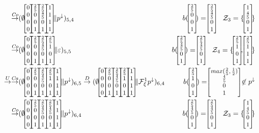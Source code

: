 \begin{example}
\begin{figure}[t]
{\begin{align*}
				\tr{\mathit{Co}}                                                                                                                                                                    & (\emptyset\cvec{0}{0}{0}{0}\cvec{\frac{2}{5}}{0}{0}{1} \cvec{\frac{2}{5}}{\frac{4}{5}}{0}{1} \cvec{1}{1}{1}{1} \| p^\downarrow)_{5,4}                                                                                                                                                                                                                        & b(\cvec{\frac{2}{5}}{0}{0}{1})= \cvec{\frac{2}{5}}{\frac{4}{5}}{0}{1} \quad \mathcal{Z}_3 = \{ \cvec{1}{\frac{4}{5}}{0}{1} \}                                       \\
				\tr{\mathit{Co}}                                                                                                                                                                    & (\emptyset\cvec{0}{0}{0}{0}\cvec{\frac{2}{5}}{0}{0}{1} \cvec{\frac{2}{5}}{\frac{4}{5}}{0}{1} \cvec{\frac{2}{5}}{1}{0}{1} \| \varepsilon)_{5,5}                                                                                                                                                                                                               & b(\cvec{\frac{2}{5}}{\frac{4}{5}}{0}{1})= \cvec{\frac{2}{5}}{\frac{4}{5}}{0}{1} \quad \mathcal{Z}_4 =\{ \cvec{\frac{2}{5}}{1}{0}{1}, \cvec{\frac{2}{5}}{1}{1}{1} \} \\
				\tr{U} \tr{\mathit{Ca}}                                                                                                                                                             & (\emptyset\cvec{0}{0}{0}{0}\cvec{\frac{2}{5}}{0}{0}{1} \cvec{\frac{2}{5}}{\frac{4}{5}}{0}{1} \cvec{\frac{2}{5}}{1}{0}{1} \cvec{1}{1}{1}{1} \| p^\downarrow)_{6,5} \tr{D} (\emptyset\cvec{0}{0}{0}{0}\cvec{\frac{2}{5}}{0}{0}{1} \cvec{\frac{2}{5}}{\frac{4}{5}}{0}{1} \cvec{\frac{2}{5}}{1}{0}{1} \cvec{1}{1}{1}{1} \| \mathcal{F}^1_\xi p^\downarrow)_{6,4} & b(\cvec{\frac{2}{5}}{1}{0}{1})= \cvec{max(\frac{2}{5},\frac{1}{2})}{\frac{4}{5}}{0}{1} \not \in p^\downarrow                                                        \\
				\tr{\mathit{Co}}                                                                                                                                                                    & (\emptyset\cvec{0}{0}{0}{0}\cvec{\frac{2}{5}}{0}{0}{1} \cvec{\frac{2}{5}}{\frac{4}{5}}{0}{1} \cvec{\frac{2}{5}}{\frac{4}{5}}{0}{1} \cvec{1}{1}{1}{1} \|  p^\downarrow)_{6,4}                                                                                                                                                                                 & b(\cvec{\frac{2}{5}}{\frac{4}{5}}{0}{1})= \cvec{\frac{2}{5}}{\frac{4}{5}}{0}{1}\quad \mathcal{Z}_3 = \{ \cvec{1}{\frac{4}{5}}{0}{1} \}

\end{align*}}
\end{figure}
\end{example}
